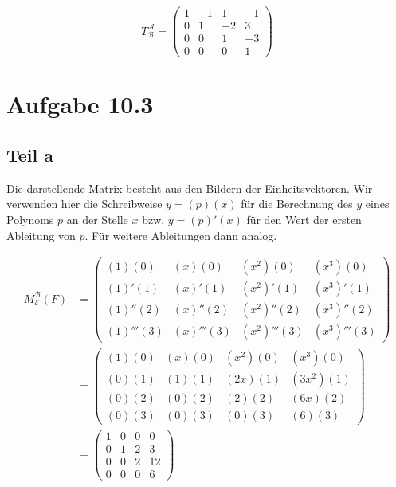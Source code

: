 \documentclass[a4paper,german,12pt,smallheadings]{scrartcl}
\begin{document}
\begin{equation}
  T_{\mathcal{B}}^{\mathcal{A}} = \begin{pmatrix} 1 & -1 & 1 & -1 \\ 0 & 1 & -2 & 3 \\ 0 & 0 & 1 & -3 \\ 0 & 0 & 0 & 1\end{pmatrix}
\end{equation}

\section*{Aufgabe 10.3}

\subsection*{Teil a}

Die darstellende Matrix besteht aus den Bildern der Einheitsvektoren. Wir
verwenden hier die Schreibweise $y = (p)(x)$ für die Berechnung des $y$ eines
Polynoms $p$ an der Stelle $x$ bzw. $y = (p)'(x)$ für den Wert der ersten
Ableitung von $p$. Für weitere Ableitungen dann analog.

\begin{align*}
  M^{\mathcal{B}}_{\mathcal{E}}(F) &=
\begin{pmatrix}
(1)(0)    & (x)(0)    & (x^2)(0)    & (x^3)(0)    \\
(1)'(1)   & (x)'(1)   & (x^2)'(1)   & (x^3)'(1)   \\
(1)''(2)  & (x)''(2)  & (x^2)''(2)  & (x^3)''(2)  \\
(1)'''(3) & (x)'''(3) & (x^2)'''(3) & (x^3)'''(3)
\end{pmatrix} \\
&=
\begin{pmatrix}
(1)(0) & (x)(0) & (x^2)(0) & (x^3)(0)  \\
(0)(1) & (1)(1) & (2x)(1)  & (3x^2)(1) \\
(0)(2) & (0)(2) & (2)(2)   & (6x)(2)   \\
(0)(3) & (0)(3) & (0)(3)   & (6)(3)
\end{pmatrix} \\
&=
\begin{pmatrix}
1 & 0 & 0 & 0  \\
0 & 1 & 2 & 3  \\
0 & 0 & 2 & 12 \\
0 & 0 & 0 & 6
\end{pmatrix}
\end{align*}
\end{document}
